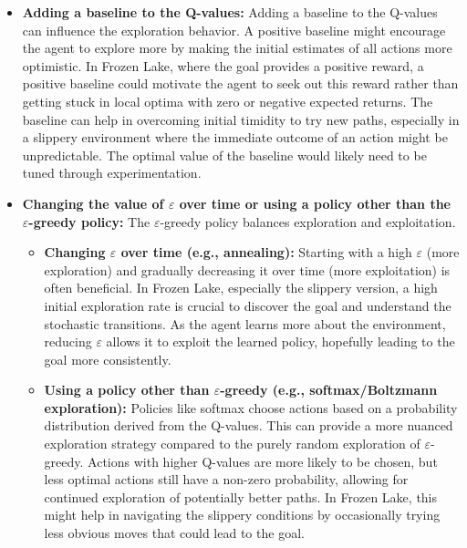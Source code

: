 \begin{itemize}
    \item \textbf{Adding a baseline to the Q-values:}
    Adding a baseline to the Q-values can influence the exploration behavior. A positive baseline might encourage the agent to explore more by making the initial estimates of all actions more optimistic. In Frozen Lake, where the goal provides a positive reward, a positive baseline could motivate the agent to seek out this reward rather than getting stuck in local optima with zero or negative expected returns. The baseline can help in overcoming initial timidity to try new paths, especially in a slippery environment where the immediate outcome of an action might be unpredictable. The optimal value of the baseline would likely need to be tuned through experimentation.

    \item \textbf{Changing the value of $\varepsilon$ over time or using a policy other than the $\varepsilon$-greedy policy:}
    The $\varepsilon$-greedy policy balances exploration and exploitation.
    \begin{itemize}
        \item \textbf{Changing $\varepsilon$ over time (e.g., annealing):} Starting with a high $\varepsilon$ (more exploration) and gradually decreasing it over time (more exploitation) is often beneficial. In Frozen Lake, especially the slippery version, a high initial exploration rate is crucial to discover the goal and understand the stochastic transitions. As the agent learns more about the environment, reducing $\varepsilon$ allows it to exploit the learned policy, hopefully leading to the goal more consistently.
        \item \textbf{Using a policy other than $\varepsilon$-greedy (e.g., softmax/Boltzmann exploration):} Policies like softmax choose actions based on a probability distribution derived from the Q-values. This can provide a more nuanced exploration strategy compared to the purely random exploration of $\varepsilon$-greedy. Actions with higher Q-values are more likely to be chosen, but less optimal actions still have a non-zero probability, allowing for continued exploration of potentially better paths. In Frozen Lake, this might help in navigating the slippery conditions by occasionally trying less obvious moves that could lead to the goal.
    \end{itemize}


\end{itemize}
